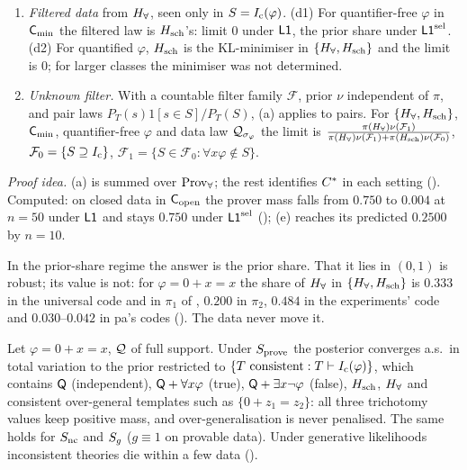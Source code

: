 \begin{theorem}
\begin{enumerate}[label=(\alph*),leftmargin=*,itemsep=1pt]
\item \emph{Filtered data} from $H_{\forall}$, seen only in $S=I_{\mathrm{c}}(\varphi)$. (d1) For quantifier-free $\varphi$ in $\mathsf{C}_{\min}$ the filtered law is $H_{\mathrm{sch}}$'s: limit $0$ under $\mathord{\mathsf{L1}}$, the prior share under $\mathord{\mathsf{L1}}^{\mathrm{sel}}$. (d2) For quantified $\varphi$, $H_{\mathrm{sch}}$ is the KL-minimiser in $\{H_{\forall},H_{\mathrm{sch}}\}$ and the limit is $0$; for larger classes the minimiser was not determined.
\item \emph{Unknown filter.} With a countable filter family $\mathcal F$, prior $\nu$ independent of $\pi$, and pair laws $P_T(s)1[s\in S]/P_T(S)$, (a) applies to pairs. For $\{H_{\forall},H_{\mathrm{sch}}\}$, $\mathsf{C}_{\min}$, quantifier-free $\varphi$ and data law $\mathcal{Q}_{\sigma_\varphi}$ the limit is $\frac{\pi(H_{\forall})\nu(\mathcal F_1)}{\pi(H_{\forall})\nu(\mathcal F_1)+\pi(H_{\mathrm{sch}})\nu(\mathcal F_0)}$, $\mathcal F_0=\{S\supseteq I_{\mathrm{c}}\}$, $\mathcal F_1=\{S\in\mathcal F_0:\forall x\varphi\notin S\}$.
\end{enumerate}
\end{theorem}

\noindent\emph{Proof idea.} (a) is  summed over $\mathrm{Prov}_{\forall}$; the rest identifies $C^{*}$ in each setting (). Computed: on closed data in $\mathsf{C}_{\mathrm{open}}$ the prover mass falls from $0.750$ to $0.004$ at $n=50$ under $\mathord{\mathsf{L1}}$ and stays $0.750$ under $\mathord{\mathsf{L1}}^{\mathrm{sel}}$ (); (e) reaches its predicted $0.2500$ by $n=10$.

In the prior-share regime the answer is the prior share. That it lies in $(0,1)$ is robust; its value is not: for $\varphi=0+x=x$ the share of $H_{\forall}$ in $\{H_{\forall},H_{\mathrm{sch}}\}$ is $0.333$ in the universal code and in $\pi_1$ of , $0.200$ in $\pi_2$, $0.484$ in the experiments' code and $0.030$--$0.042$ in pa's codes (). The data never move it.

\begin{proposition}\label{prop:univ:hanni}
Let $\varphi=0+x=x$, $\mathcal{Q}$ of full support. Under $S_{\mathrm{prove}}$ the posterior converges a.s.\ in total variation to the prior restricted to $\{T\text{ consistent}:T\vdash I_{\mathrm{c}}(\varphi)\}$, which contains $\mathsf{Q}$ (independent), $\mathsf{Q}+\forall x\varphi$ (true), $\mathsf{Q}+\exists x\neg\varphi$ (false), $H_{\mathrm{sch}}$, $H_{\forall}$ and consistent over-general templates such as $\{0+z_1=z_2\}$: all three trichotomy values keep positive mass, and over-generalisation is never penalised. The same holds for $S_{\mathrm{nc}}$ and $S_{g}$ ($g\equiv1$ on provable data). Under generative likelihoods inconsistent theories die within a few data ().
\end{proposition}

